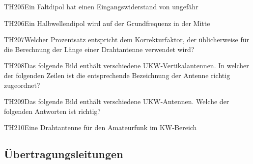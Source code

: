 \begin{question}{TH205}{Ein Faltdipol hat einen Eingangswiderstand von ungefähr}
\end{question}

\begin{question}{TH206}{Ein Halbwellendipol wird auf der Grundfrequenz in der Mitte}
\end{question}

\begin{question}{TH207}{Welcher Prozentsatz entspricht dem Korrekturfaktor, der üblicherweise für die Berechnung der Länge einer Drahtantenne verwendet wird?}
\end{question}

\begin{question}{TH208}{Das folgende Bild enthält verschiedene UKW-Vertikalantennen. In welcher der folgenden Zeilen ist die entsprechende Bezeichnung der Antenne richtig zugeordnet?}
\end{question}

\begin{question}{TH209}{Das folgende Bild enthält verschiedene UKW-Antennen. Welche der folgenden Antworten ist richtig?}
\end{question}

\begin{question}{TH210}{Eine Drahtantenne für den Amateurfunk im KW-Bereich}
\end{question}

\subsection{Übertragungsleitungen}

